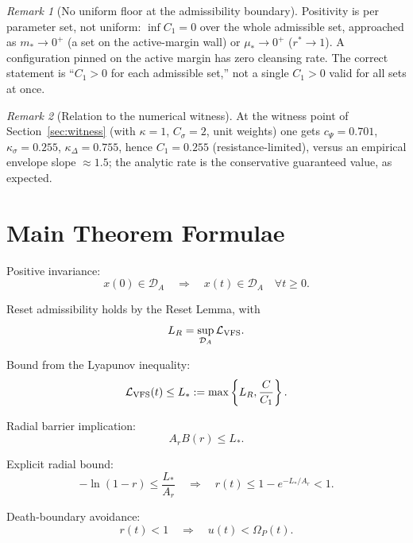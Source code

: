 \documentclass[11pt,a4paper]{article}
\newcommand{\DA}{\mathcal D_A}
\newcommand{\LV}{\mathcal L_{\rm VFS}}
\newcommand{\Om}{\Omega_P}
\theoremstyle{remark}
\newtheorem*{remark}{Remark}
\begin{document}
\begin{remark}[No uniform floor at the admissibility boundary]
Positivity is per parameter set, not uniform: $\inf C_1=0$ over the whole
admissible set, approached as $m_*\to0^+$ (a set on the active-margin wall) or
$\mu_*\to0^+$ ($r^*\to1$). A configuration pinned on the active margin has zero
cleansing rate. The correct statement is ``$C_1>0$ for each admissible set,''
not a single $C_1>0$ valid for all sets at once.
\end{remark}

\begin{remark}[Relation to the numerical witness]
At the witness point of Section~\ref{sec:witness} (with $\kappa=1$, $C_\sigma=2$,
unit weights) one gets $c_\Psi=0.701$, $\kappa_\sigma=0.255$,
$\kappa_\Delta=0.755$, hence $C_1=0.255$ (resistance-limited), versus an
empirical envelope slope $\approx1.5$; the analytic rate is the conservative
guaranteed value, as expected.
\end{remark}

\section{Main Theorem Formulae}

Positive invariance:
\begin{equation}
  x(0)\in\DA
  \quad\Longrightarrow\quad
  x(t)\in\DA\quad\forall t\ge0.
\end{equation}

Reset admissibility holds by the Reset Lemma, with
\begin{equation}
  L_R=\sup_{\DA}\LV.
\end{equation}

Bound from the Lyapunov inequality:
\begin{equation}
  \LV(t)\le L_*:=\max\left\{L_R,\frac{C}{C_1}\right\}.
\end{equation}

Radial barrier implication:
\begin{equation}
  A_rB(r)\le L_*.
\end{equation}

Explicit radial bound:
\begin{equation}
  -\ln(1-r)\le\frac{L_*}{A_r}
  \quad\Longrightarrow\quad
  r(t)\le1-e^{-L_*/A_r}<1.
\end{equation}

Death-boundary avoidance:
\begin{equation}
  r(t)<1
  \quad\Longrightarrow\quad
  u(t)<\Om(t).
\end{equation}
\end{document}
